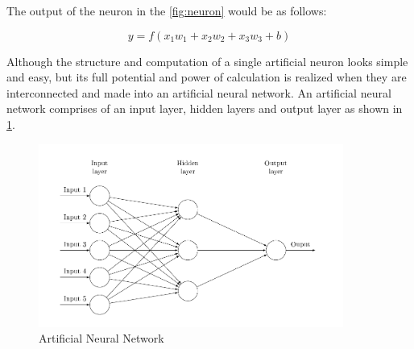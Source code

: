 The output of the neuron in the \ref{fig:neuron} would be as follows:

\begin{equation}
y=f(x_{1}w_{1}+x_{2}w_{2}+x_{3}w_{3}+b)
\label{eq:NNformula}
\end{equation}

Although the structure and computation of a single artificial neuron looks simple and easy, but its full potential and power of calculation is realized when they are interconnected and made into an artificial neural network. An artificial neural network comprises of an input layer, hidden layers and output layer as shown in \ref{fig:NN}.
\begin{figure}[!ht]
    \centering
    \captionsetup{justification=centering,margin=2cm}
    \includegraphics[width=10cm]{pics/neural_network.png}
    \caption{Artificial Neural Network}
    \label{fig:NN}
\end{figure}

